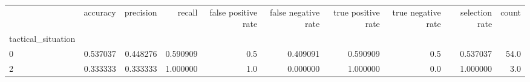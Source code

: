 \begin{tabular}{lrrrrrrrrr}
\toprule
{} &  accuracy &  precision &    recall &  false positive rate &  false negative rate &  true positive rate &  true negative rate &  selection rate &  count \\
tactical\_situation &           &            &           &                      &                      &                     &                     &                 &        \\
\midrule
0                  &  0.537037 &   0.448276 &  0.590909 &                  0.5 &             0.409091 &            0.590909 &                 0.5 &        0.537037 &   54.0 \\
2                  &  0.333333 &   0.333333 &  1.000000 &                  1.0 &             0.000000 &            1.000000 &                 0.0 &        1.000000 &    3.0 \\
\bottomrule
\end{tabular}
